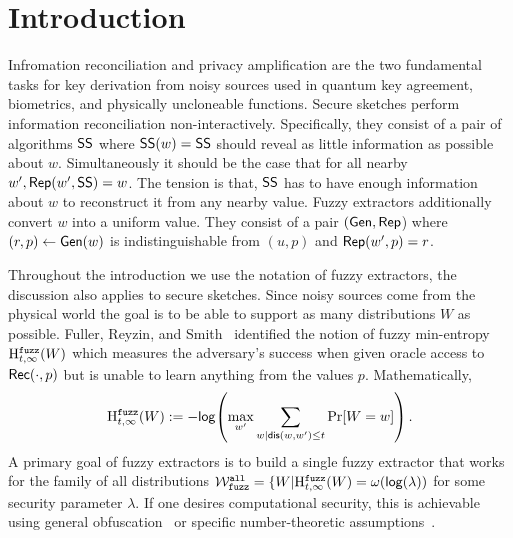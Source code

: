 
\section{Introduction}
Infromation reconciliation and privacy amplification are the two fundamental tasks for key derivation from noisy sources used in quantum key agreement, biometrics, and physically uncloneable functions. Secure sketches perform information reconciliation non-interactively.  Specifically, they consist of a pair of algorithms ${\mathsf{SS}}$ where ${\mathsf{SS}}(w) = {\mathsf{SS}}$ should reveal as little information as possible about $w$.  Simultaneously it should be the case that for all nearby $w', {\mathsf{Rep}}(w', {\mathsf{SS}}) = w$.  The tension is that, ${\mathsf{SS}}$ has to have enough information about $w$ to reconstruct it from any nearby value.  Fuzzy extractors additionally convert $w$ into a uniform value.  They consist of a pair $({\mathsf{Gen}}, {\mathsf{Rep}}$) where $(r, p)\leftarrow {\ensuremath{\mathsf{Gen}}}(w)$ is indistinguishable from $(u, p)$ and ${\mathsf{Rep}}(w', p) =r$.

Throughout the introduction we use the notation of fuzzy extractors, the discussion also applies to secure sketches. 
Since noisy sources come from the physical world the goal is to be able to support as many distributions $W$ as possible.  Fuller, Reyzin, and Smith~\cite{fuller2016fuzzy,fuller2020fuzzy} identified the notion of fuzzy min-entropy $\mathrm{H}^{\mathtt{fuzz}}_{t,\infty}(W)$ which measures the adversary's success when given oracle access to ${\mathsf{Rec}}(\cdot, p)$ but is unable to learn anything from the values  $p$.  Mathematically,
\[
\mathrm{H}^{\mathtt{fuzz}}_{t,\infty}(W):= -\mathsf{log}\!\left(\max_{w'} \sum_{w | \mathsf{dis}(w, w')\le t} \Pr[W=w]\right).
\]A primary goal of fuzzy extractors is to build a single fuzzy extractor that works for the family of all distributions $\mathcal{W}_{\mathtt{fuzz}}^{\mathtt{all}} = \{ W | \mathrm{H}^{\mathtt{fuzz}}_{t,\infty}(W) = \omega(\mathsf{log}\!\left(\lambda\right))$ for some security parameter $\lambda$.  If one desires computational security, this is achievable using general obfuscation~\cite{BarakBCKPS13,BitanskyCKP14,bitansky2017virtual} or specific number-theoretic assumptions~\cite{galbraith2019obfuscated}. 

